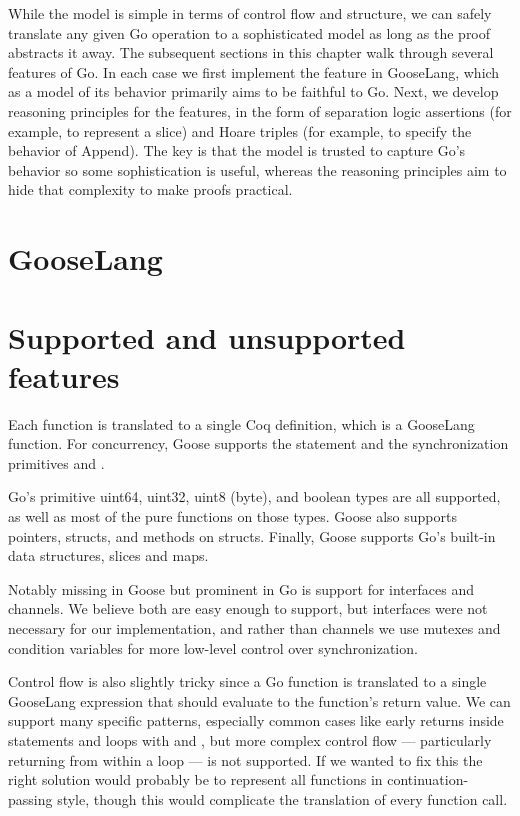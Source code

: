 While the model is simple in terms of control flow and structure, we can
safely translate any given Go operation to a sophisticated model as long
as the proof abstracts it away. The subsequent sections in this chapter
walk through several features of Go. In each case we first implement the
feature in GooseLang, which as a model of its behavior primarily aims to
be faithful to Go. Next, we develop reasoning principles for the
features, in the form of separation logic assertions (for example, to
represent a slice) and Hoare triples (for example, to specify the
behavior of Append). The key is that the model is trusted to capture
Go's behavior so some sophistication is useful, whereas the reasoning
principles aim to hide that complexity to make proofs practical.

\section{GooseLang}



\resume

\section{Supported and unsupported
features}

Each function is translated to a single Coq definition, which is a
GooseLang function. For concurrency, Goose supports the 
statement and the synchronization primitives  and
.

Go's primitive uint64, uint32, uint8 (byte), and boolean types are all
supported, as well as most of the pure functions on those types. Goose
also supports pointers, structs, and methods on structs. Finally, Goose
supports Go's built-in data structures, slices and maps.

Notably missing in Goose but prominent in Go is support for interfaces
and channels. We believe both are easy enough to support, but interfaces
were not necessary for our implementation, and rather than channels we
use mutexes and condition variables for more low-level control over
synchronization.

Control flow is also slightly tricky since a Go function is translated
to a single GooseLang expression that should evaluate to the function's
return value. We can support many specific patterns, especially common
cases like early returns inside  statements and loops with
 and , but more complex control flow ---
particularly returning from within a loop --- is not supported. If we
wanted to fix this the right solution would probably be to represent all
functions in continuation-passing style, though this would complicate
the translation of every function call.

